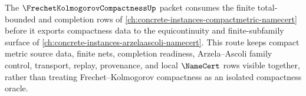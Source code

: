 The $\FrechetKolmogorovCompactnessUp$ packet consumes the finite total-bounded and completion rows of \autoref{ch:concrete-instances-compactmetric-namecert} before it exports compactness data to the equicontinuity and finite-subfamily surface of \autoref{ch:concrete-instances-arzelaascoli-namecert}. This route keeps compact metric source data, finite nets, completion readiness, Arzela--Ascoli family control, transport, replay, provenance, and local $\NameCert$ rows visible together, rather than treating Frechet--Kolmogorov compactness as an isolated compactness oracle.
